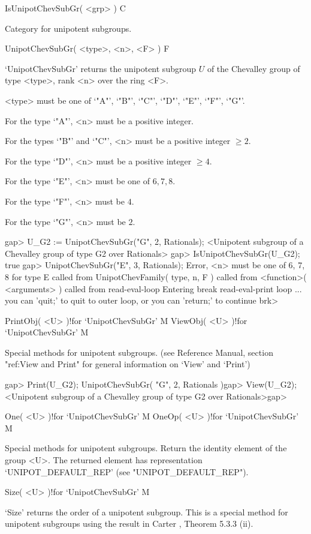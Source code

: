 \>IsUnipotChevSubGr( <grp> ) C

Category for unipotent subgroups.

\>UnipotChevSubGr( <type>, <n>, <F> ) F

`UnipotChevSubGr'  returns  the  unipotent  subgroup $U$ of the Chevalley
group of type <type>, rank <n> over the ring <F>.

<type> must be one of `"A"', `"B"', `"C"', `"D"', `"E"', `"F"', `"G"'.

For the type  `"A"', <n> must be a positive integer.

For the types `"B"' and `"C"', <n> must be a positive integer $\geq 2$.

For the type  `"D"', <n> must be a positive integer $\geq 4$.

For the type  `"E"', <n> must be one of $6, 7, 8$.

For the type  `"F"', <n> must be $4$.

For the type  `"G"', <n> must be $2$.


\beginexample
gap> U_G2 := UnipotChevSubGr("G", 2, Rationals);
<Unipotent subgroup of a Chevalley group of type G2 over Rationals>
gap> IsUnipotChevSubGr(U_G2);
true
\endexample
\begintt
gap> UnipotChevSubGr("E", 3, Rationals);
Error, <n> must be one of 6, 7, 8 for type E  called from
UnipotChevFamily( type, n, F ) called from
<function>( <arguments> ) called from read-eval-loop
Entering break read-eval-print loop ...
you can 'quit;' to quit to outer loop, or
you can 'return;' to continue
brk>
\endtt

\>PrintObj( <U> )!{for `UnipotChevSubGr'} M
\>ViewObj( <U> )!{for `UnipotChevSubGr'} M

Special methods for unipotent  subgroups.  (see  {\GAP} Reference Manual,
section  "ref:View  and  Print"  for general  information  on `View'  and
`Print')

\beginexample
gap> Print(U_G2);
UnipotChevSubGr( "G", 2, Rationals )gap> View(U_G2);
<Unipotent subgroup of a Chevalley group of type G2 over Rationals>gap>
\endexample

\>One( <U> )!{for `UnipotChevSubGr'} M
\>OneOp( <U> )!{for `UnipotChevSubGr'} M

Special  methods  for unipotent  subgroups. Return the  identity
element   of   the   group  <U>.   The   returned   element  has
representation `UNIPOT_DEFAULT_REP' (see "UNIPOT_DEFAULT_REP").


\>Size( <U> )!{for `UnipotChevSubGr'} M

`Size' returns  the order  of a unipotent subgroup.  This  is  a
special  method for  unipotent  subgroups  using the  result  in
Carter \cite{Carter72}, Theorem 5.3.3 (ii).

